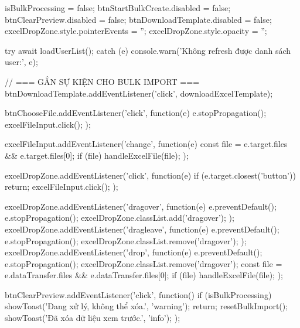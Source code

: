 {{                isBulkProcessing = false;
                btnStartBulkCreate.disabled = false;
                btnClearPreview.disabled = false;
                btnDownloadTemplate.disabled = false;
                excelDropZone.style.pointerEvents = '';
                excelDropZone.style.opacity = '';

                try {
                    await loadUserList();
                } catch (e) {
                    console.warn('Không refresh được danh sách user:', e);
                }
            }

            // === GẮN SỰ KIỆN CHO BULK IMPORT ===
            btnDownloadTemplate.addEventListener('click', downloadExcelTemplate);

            btnChooseFile.addEventListener('click', function(e) {
                e.stopPropagation();
                excelFileInput.click();
            });

            excelFileInput.addEventListener('change', function(e) {
                const file = e.target.files && e.target.files[0];
                if (file) handleExcelFile(file);
            });

            excelDropZone.addEventListener('click', function(e) {
                if (e.target.closest('button')) return;
                excelFileInput.click();
            });

            excelDropZone.addEventListener('dragover', function(e) {
                e.preventDefault();
                e.stopPropagation();
                excelDropZone.classList.add('dragover');
            });
            excelDropZone.addEventListener('dragleave', function(e) {
                e.preventDefault();
                e.stopPropagation();
                excelDropZone.classList.remove('dragover');
            });
            excelDropZone.addEventListener('drop', function(e) {
                e.preventDefault();
                e.stopPropagation();
                excelDropZone.classList.remove('dragover');
                const file = e.dataTransfer.files && e.dataTransfer.files[0];
                if (file) handleExcelFile(file);
            });

            btnClearPreview.addEventListener('click', function() {
                if (isBulkProcessing) {
                    showToast('Đang xử lý, không thể xóa.', 'warning');
                    return;
                }
                resetBulkImport();
                showToast('Đã xóa dữ liệu xem trước.', 'info');
            });

}
